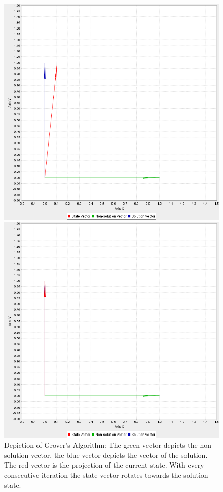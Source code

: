 \documentclass[bibliography=totocnumbered, 10pt]{article}
\theoremstyle{NoticeStyle}
\begin{document}
\begin{figure}[H]
\begin{minipage}{0.3\textwidth}
	\end{minipage}
	\begin{minipage}{0.3\textwidth}
		\includegraphics[width=\textwidth]{img/pic_12.png}
	\end{minipage}
	\begin{minipage}{0.3\textwidth}
		\includegraphics[width=\textwidth]{img/pic_13.png}
	\end{minipage}
	\caption{Depiction of Grover's Algorithm: The green vector depicts the non-solution vector, the blue vector depicts the vector of the solution. The red vector is the projection of the current state. With every consecutive iteration the state vector rotates towards the solution state.}
	\label{grover_rotation}
\end{figure}
\end{document}
